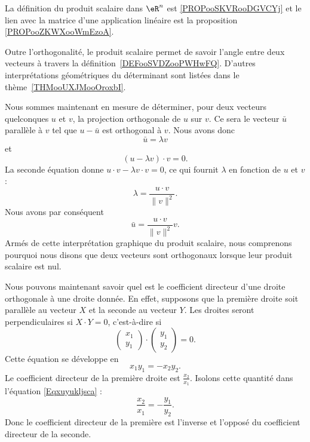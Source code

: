La définition du produit scalaire dans \( \eR^n\) est \ref{PROPooSKVRooDGVCYj} et le lien avec la matrice d'une application linéaire est la proposition \ref{PROPooZKWXooWmEzoA}.

\begin{remark}
    Outre l'orthogonalité, le produit scalaire permet de savoir l'angle entre deux vecteurs à travers la définition~\ref{DEFooSVDZooPWHwFQ}. D'autres interprétations géométriques du déterminant sont listées dans le thème~\ref{THMooUXJMooOroxbI}.
\end{remark}

Nous sommes maintenant en mesure de déterminer, pour deux vecteurs quelconques $u$ et $v$, la projection orthogonale de $u$ sur $v$. Ce sera le vecteur $\bar u$ parallèle à $v$ tel que $u-\bar u$ est orthogonal à $v$. Nous avons donc
\begin{equation}
    \bar u=\lambda v
\end{equation}
et
\begin{equation}
    (u-\lambda v)\cdot v=0.
\end{equation}
La seconde équation donne $u\cdot v-\lambda v\cdot v=0$, ce qui fournit $\lambda$ en fonction de $u$ et $v$ :
\begin{equation}
    \lambda=\frac{ u\cdot v }{ \| v \|^2 }.
\end{equation}
Nous avons par conséquent
\begin{equation}
    \bar u=\frac{ u\cdot v }{ \| v \|^2 }v.
\end{equation}
Armés de cette interprétation graphique du produit scalaire, nous comprenons pourquoi nous disons que deux vecteurs sont orthogonaux lorsque leur produit scalaire est nul.

Nous pouvons maintenant savoir quel est le coefficient directeur d'une droite orthogonale à une droite donnée. En effet, supposons que la première droite soit parallèle au vecteur $X$ et la seconde au vecteur $Y$. Les droites seront perpendiculaires si $X\cdot Y=0$, c'est-à-dire si
\begin{equation}
	\begin{pmatrix}
		x_1	\\
		y_1
	\end{pmatrix}\cdot\begin{pmatrix}
		y_1	\\
		y_2
	\end{pmatrix}=0.
\end{equation}
Cette équation se développe en
\begin{equation}		\label{Eqxuyukljsca}
	x_1y_1=-x_2y_2.
\end{equation}
Le coefficient directeur de la première droite est $\frac{ x_2 }{ x_1 }$. Isolons cette quantité dans l'équation \eqref{Eqxuyukljsca} :
\begin{equation}
	\frac{ x_2 }{ x_1 }=-\frac{ y_1 }{ y_2 }.
\end{equation}
Donc le coefficient directeur de la première est l'inverse et l'opposé du coefficient directeur de la seconde.


